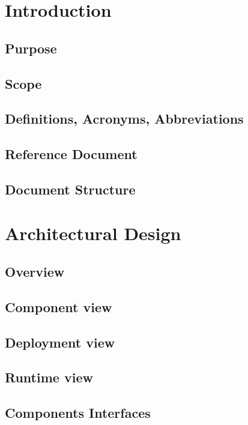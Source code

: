 \documentclass{article}
\begin{document}
	\newpage
	
	
	\section{Introduction}
		\subsection{Purpose}
		\subsection{Scope}
		\subsection{Definitions, Acronyms, Abbreviations}
		\subsection{Reference Document}
		\subsection{Document Structure}
	\section{Architectural Design}
		\subsection{Overview}
		\subsection{Component view}
		\subsection{Deployment view}
		\subsection{Runtime view}
		\subsection{Components Interfaces}
\end{document}
